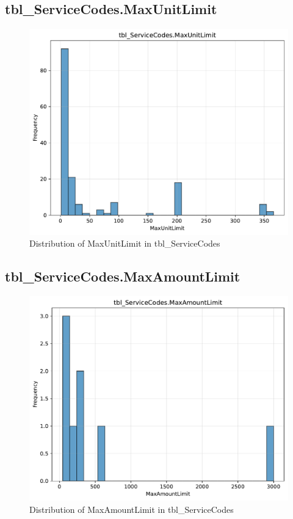 \subsection{tbl\_ServiceCodes.MaxUnitLimit}

\begin{figure}[htbp]
\centering
\includegraphics[width=\textwidth]{figures/dbo_tbl_ServiceCodes_MaxUnitLimit.pdf}
\caption{Distribution of MaxUnitLimit in tbl\_ServiceCodes}
\end{figure}\newpage

\subsection{tbl\_ServiceCodes.MaxAmountLimit}

\begin{figure}[htbp]
\centering
\includegraphics[width=\textwidth]{figures/dbo_tbl_ServiceCodes_MaxAmountLimit.pdf}
\caption{Distribution of MaxAmountLimit in tbl\_ServiceCodes}
\end{figure}\newpage
